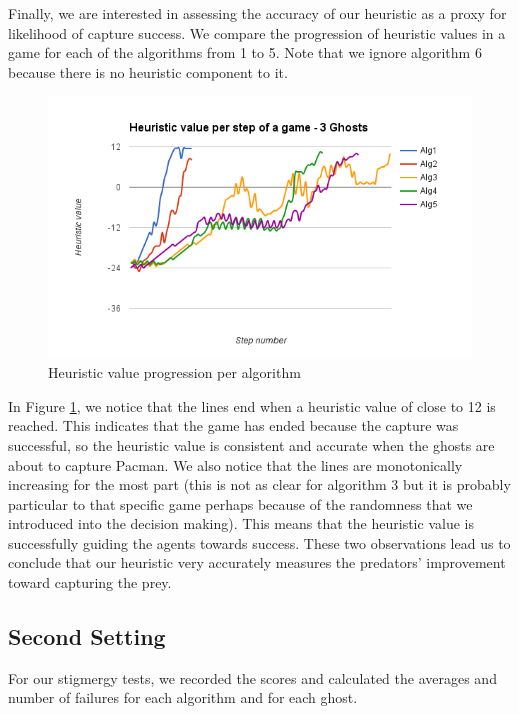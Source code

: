 \documentclass[11pt]{article}
\begin{document}
Finally, we are interested in assessing the accuracy of our heuristic as a proxy for likelihood of capture success. We compare the progression of heuristic values in a game for each of the algorithms from 1 to 5. Note that we ignore algorithm 6 because there is no heuristic component to it.\\
\begin{figure}[H]
	\includegraphics[scale=0.45]{heuristicvalues.png}
	\caption{Heuristic value progression per algorithm}
	\label{fig:heuristicvalueprogression}
\end{figure}

\noindent In Figure \ref{fig:heuristicvalueprogression}, we notice that the lines end when a heuristic value of close to 12 is reached. This indicates that the game has ended because the capture was successful, so the heuristic value is consistent and accurate when the ghosts are about to capture Pacman. We also notice that the lines are monotonically increasing for the most part (this is not as clear for algorithm 3 but it is probably particular to that specific game perhaps because of the randomness that we introduced into the decision making). This means that the heuristic value is successfully guiding the agents towards success. These two observations lead us to conclude that our heuristic very accurately measures the predators' improvement toward capturing the prey. 

\subsection{Second Setting}

For our stigmergy tests, we recorded the scores and calculated the averages and number of failures for each algorithm and for each ghost. 
\end{document}
